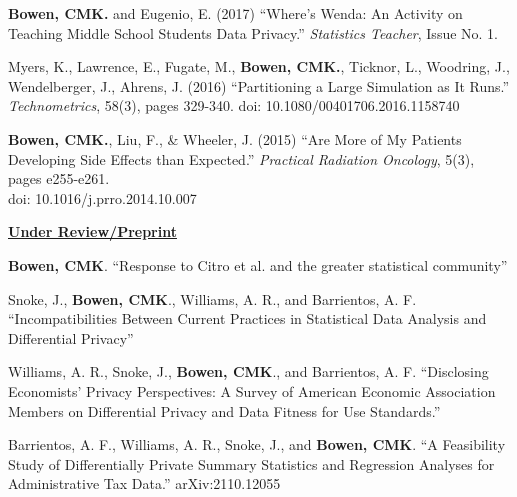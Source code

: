 \begin{etaremune}[topsep=0pt, itemsep=5pt, partopsep=0pt, parsep=0pt]
    \item \textbf{Bowen, CMK.} and Eugenio, E. (2017) ``Where's Wenda:  An Activity on Teaching Middle School Students Data Privacy.'' \textit{Statistics Teacher}, Issue No. 1.
    
    \item Myers, K., Lawrence, E., Fugate, M., \textbf{Bowen, CMK.}, Ticknor, L., Woodring, J., Wendelberger, J., Ahrens, J. (2016) ``Partitioning a Large Simulation as It Runs.'' \textit{Technometrics}, 58(3), pages 329-340. doi: 10.1080/00401706.2016.1158740

    \item \textbf{Bowen, CMK.}, Liu, F., \& Wheeler, J. (2015) ``Are More of My Patients Developing Side Effects than Expected.'' \textit{Practical Radiation Oncology}, 5(3), pages e255-e261.\\
    doi: 10.1016/j.prro.2014.10.007
\end{etaremune}

\vspace{4pt}
\noindent\underline{\textbf{Under Review/Preprint}}
\begin{etaremune}[topsep=0pt, itemsep=4pt, partopsep=0pt, parsep=0pt]  
    \item \textbf{Bowen, CMK}. ``Response to Citro et al. and the greater statistical community''
    
    \item Snoke, J., \textbf{Bowen, CMK}., Williams, A. R., and Barrientos, A. F. ``Incompatibilities Between Current Practices in Statistical Data Analysis and Differential Privacy''
    
    \item Williams, A. R., Snoke, J., \textbf{Bowen, CMK}., and Barrientos, A. F. ``Disclosing Economists' Privacy Perspectives: A Survey of American Economic Association Members on Differential Privacy and Data Fitness for Use Standards.''
    
    \item Barrientos, A. F., Williams, A. R., Snoke, J., and \textbf{Bowen, CMK}. ``A Feasibility Study of Differentially Private Summary Statistics and Regression Analyses for Administrative Tax Data.'' arXiv:2110.12055
\end{etaremune}

